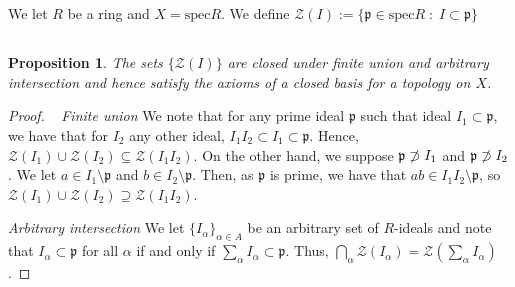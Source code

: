 \documentclass[english]{article}
\newcommand{\Zcal}{\mathcal{Z}}
\newcommand{\pfr}{\mathfrak{p}}
\newcommand{\prob}[1]{\setcounter{section}{#1-1}\section{}}
\newcommand{\prt}[1]{\setcounter{subsection}{#1-1}\subsection{}}
\newtheorem*{prop*}{Proposition}
\theoremstyle{remark}
\theoremstyle{definition}
\newcommand{\spec}{\mathrm{spec}}
\begin{document}
%
%
\prob{3} We let $R$ be a ring and $X=\spec R$. We define $\Zcal(I):=\{\pfr\in \spec R\;:\;I\subset \pfr\}$
\prt{1}\begin{prop*}     
	The  sets $\{\Zcal(I)\}$ are closed under finite union and arbitrary intersection and hence satisfy the axioms of a closed basis for a topology on $X$.
\end{prop*}\begin{proof}~
\emph{Finite union} We note that for any prime ideal $\pfr$ such that ideal $I_1\subset \pfr$, we have that for $I_2$ any other ideal, $I_1I_2\subset I_1\subset \pfr$. Hence, $\Zcal(I_1)\cup \Zcal(I_2)\subseteq\Zcal(I_1I_2)$. On the other hand, we suppose $\pfr \centernot\supset I_1$ and $\pfr \centernot \supset I_2$. We let $a\in I_1\setminus \pfr$ and $b\in I_2\setminus \pfr$. Then, as $\pfr$ is prime, we have that $ab\in I_1I_2\setminus \pfr$, so $\Zcal(I_1)\cup \Zcal(I_2)\supseteq\Zcal(I_1I_2)$.

\emph{Arbitrary intersection} We let $\{I_\alpha\}_{\alpha\in A}$ be an arbitrary set of $R$-ideals and note that $I_\alpha\subset \pfr$ for all $\alpha$ if and only if $\sum_\alpha I_\alpha\subset \pfr$. Thus, $\bigcap_\alpha \Zcal(I_\alpha)=\Zcal(\sum_\alpha I_\alpha) $.
\end{proof}
\end{document}
